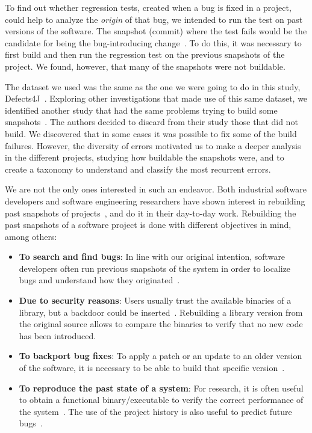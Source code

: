 
To find out whether regression tests, created when a bug is fixed in a project, could help to analyze the \emph{origin} of that bug, we intended to run the test on past versions of the software.
The snapshot (commit) where the test fails would be the candidate for being the bug-introducing change~\cite{kim2006automatic}.
To do this, it was necessary to first build and then run the regression test on the previous snapshots of the project.
We found, however, that many of the snapshots were not buildable.

The dataset we used was the same as the one we were going to do in this study, Defects4J~\cite{Just:2014:DDE:2610384.2628055}.
Exploring other investigations that made use of this same dataset, we identified another study that had the same problems trying to build some snapshots~\cite{Just:2014:MVS:2635868.2635929}.
The authors decided to discard from their study those that did not build.
We discovered that in some cases it was possible to fix some of the build failures.
However, the diversity of errors motivated us to make a deeper analysis in the different projects, studying how buildable the snapshots were, and to create a taxonomy to understand and classify the most recurrent errors.

We are not the only ones interested in such an endeavor.
Both industrial software developers and software engineering researchers have shown interest in rebuilding past snapshots of projects~\cite{nikitin2017chainiac, RepBlds:2017:Online}, and do it in their day-to-day work.
Rebuilding the past snapshots of a software project is done with different objectives in mind, among others:

\begin{itemize}
	\item \textbf{{To search and find bugs}}: In line with our original intention, software developers often run previous snapshots of the system in order to localize bugs and understand how they originated~\cite{Zimmermann:2006:MVA:1137983.1138001}.
	\item \textbf{{Due to security reasons}}: Users usually trust the available binaries of a library, but a backdoor could be inserted~\cite{deCarnedeCarnavalet:2014:CIV:2664243.2664288}.
Rebuilding a library version from the original source allows to compare the binaries to verify that no new code has been introduced.
	\item \textbf{{To backport bug fixes}}: To apply a patch or an update to an older version of the software, it is necessary to be able to build that specific version~\cite{tian2017mining}.
	\item \textbf{{To reproduce the past state of a system}}: For research, it is often useful to obtain a functional binary/executable to verify the correct performance of the system~\cite{manacero2011using}.
	The use of the project history is also useful to predict future bugs~\cite{Zimmermann2008}.
\end{itemize}

